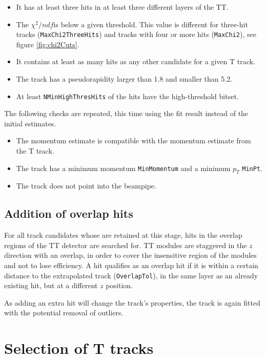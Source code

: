 \begin{itemize}
\item It has at least three hits in at least three different layers of the TT.
\item The $\chi^{2}/ndf$is below a given threshold. This value is different for
three-hit tracks (\texttt{MaxChi2ThreeHits}) and tracks with four or more hits (\texttt{MaxChi2}),
see figure \ref{fig:chi2Cuts}. 
\item It contains at least as many hits as any other candidate for a given T track.
\item The track has a pseudorapidity larger than 1.8 and smaller than 5.2.
\item At least \texttt{NMinHighThresHits} of the hits have the high-threshold
bitset.
\end{itemize}

The following checks are repeated, this time using the fit result instead of the initial estimates.

\begin{itemize}
\item The momentum estimate is compatible with the momentum estimate from the
T track.
\item The track has a minimum momentum \texttt{MinMomentum} and a minimum $p_{T}$ \texttt{MinPt}.
\item The track does not point into the beampipe.
\end{itemize}

\subsection{Addition of overlap hits}
\label{sec:addOverlap}
For all track candidates whose are retained at this stage, hits in the overlap
regions of the TT detector are searched for. 
TT modules are staggered in the $z$ direction with an overlap, in order to cover the insensitive region of the modules and not to lose efficiency. A hit qualifies as an overlap hit if it
is within a certain distance to the extrapolated track (\texttt{OverlapTol}), in the same
layer as an already existing hit, but at a
different $z$ position.

As adding an extra hit will change the track's properties, the track
is again fitted with the potential removal of outliers. 


\section{Selection of T tracks }
\label{sec:TSeed}

